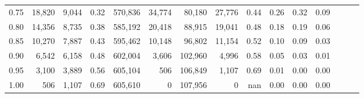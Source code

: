 \begin{tabular}{rrrrrrrrrrrrrrr}
0.75 &  18,820 &  9,044 &  0.32 &  570,836 &   34,774 &   80,180 &   27,776 &  0.44 &  0.26 &  0.32 &      0.09 \\
0.80 &  14,356 &  8,735 &  0.38 &  585,192 &   20,418 &   88,915 &   19,041 &  0.48 &  0.18 &  0.19 &      0.06 \\
0.85 &  10,270 &  7,887 &  0.43 &  595,462 &   10,148 &   96,802 &   11,154 &  0.52 &  0.10 &  0.09 &      0.03 \\
0.90 &   6,542 &  6,158 &  0.48 &  602,004 &    3,606 &  102,960 &    4,996 &  0.58 &  0.05 &  0.03 &      0.01 \\
0.95 &   3,100 &  3,889 &  0.56 &  605,104 &      506 &  106,849 &    1,107 &  0.69 &  0.01 &  0.00 &      0.00 \\
1.00 &     506 &  1,107 &  0.69 &  605,610 &        0 &  107,956 &        0 &   nan &  0.00 &  0.00 &      0.00 \\
\bottomrule
\end{tabular}
